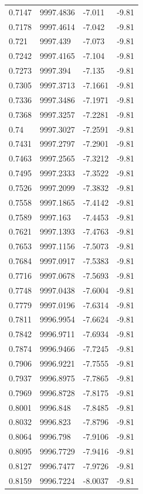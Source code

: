 \begin{table}[H]
\begin{tabular}{llll}
0.7147 & 9997.4836 & -7.011 & -9.81 \\
0.7178 & 9997.4614 & -7.042 & -9.81 \\
0.721 & 9997.439 & -7.073 & -9.81 \\
0.7242 & 9997.4165 & -7.104 & -9.81 \\
0.7273 & 9997.394 & -7.135 & -9.81 \\
0.7305 & 9997.3713 & -7.1661 & -9.81 \\
0.7336 & 9997.3486 & -7.1971 & -9.81 \\
0.7368 & 9997.3257 & -7.2281 & -9.81 \\
0.74 & 9997.3027 & -7.2591 & -9.81 \\
0.7431 & 9997.2797 & -7.2901 & -9.81 \\
0.7463 & 9997.2565 & -7.3212 & -9.81 \\
0.7495 & 9997.2333 & -7.3522 & -9.81 \\
0.7526 & 9997.2099 & -7.3832 & -9.81 \\
0.7558 & 9997.1865 & -7.4142 & -9.81 \\
0.7589 & 9997.163 & -7.4453 & -9.81 \\
0.7621 & 9997.1393 & -7.4763 & -9.81 \\
0.7653 & 9997.1156 & -7.5073 & -9.81 \\
0.7684 & 9997.0917 & -7.5383 & -9.81 \\
0.7716 & 9997.0678 & -7.5693 & -9.81 \\
0.7748 & 9997.0438 & -7.6004 & -9.81 \\
0.7779 & 9997.0196 & -7.6314 & -9.81 \\
0.7811 & 9996.9954 & -7.6624 & -9.81 \\
0.7842 & 9996.9711 & -7.6934 & -9.81 \\
0.7874 & 9996.9466 & -7.7245 & -9.81 \\
0.7906 & 9996.9221 & -7.7555 & -9.81 \\
0.7937 & 9996.8975 & -7.7865 & -9.81 \\
0.7969 & 9996.8728 & -7.8175 & -9.81 \\
0.8001 & 9996.848 & -7.8485 & -9.81 \\
0.8032 & 9996.823 & -7.8796 & -9.81 \\
0.8064 & 9996.798 & -7.9106 & -9.81 \\
0.8095 & 9996.7729 & -7.9416 & -9.81 \\
0.8127 & 9996.7477 & -7.9726 & -9.81 \\
0.8159 & 9996.7224 & -8.0037 & -9.81 \\

\end{tabular}
\end{table}
